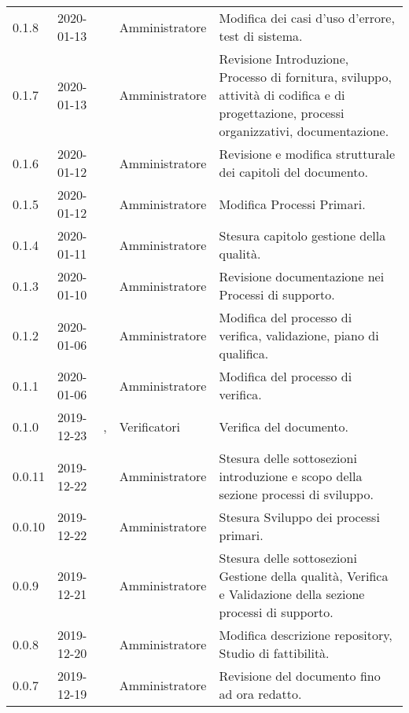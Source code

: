 {\begin{longtable}{C{2cm} C{2cm}  C{3cm}  C{3cm} C{4.5cm}}
0.1.8 & 2020-01-13 & \BR{} & Amministratore & Modifica dei casi d'uso d'errore, test di sistema. \\

0.1.7 & 2020-01-13 & \AT{} & Amministratore & Revisione Introduzione, Processo di fornitura, sviluppo, attività di codifica e di progettazione, processi organizzativi, documentazione. \\

0.1.6 & 2020-01-12 & \MC{} & Amministratore & Revisione e modifica strutturale dei capitoli del documento. \\

0.1.5 & 2020-01-12 & \AT{} & Amministratore & Modifica Processi Primari. \\

0.1.4 & 2020-01-11 & \MC{} & Amministratore & Stesura capitolo gestione della qualità. \\

0.1.3 & 2020-01-10 & \MC{} & Amministratore & Revisione documentazione nei Processi di supporto. \\

0.1.2 & 2020-01-06 & \AT{} & Amministratore & Modifica del processo di verifica, validazione, piano di qualifica. \\

0.1.1 & 2020-01-06 & \AT{} & Amministratore & Modifica del processo di verifica. \\

0.1.0 & 2019-12-23 & \PF{}, \CE{} & Verificatori & Verifica del documento. \\

0.0.11 & 2019-12-22 & \PF{} & Amministratore & Stesura delle sottosezioni introduzione e scopo della sezione processi di sviluppo. \\

0.0.10 & 2019-12-22 & \PF{}  & Amministratore & Stesura Sviluppo dei processi primari. \\

0.0.9 & 2019-12-21 & \PF{} & Amministratore & Stesura delle sottosezioni Gestione della qualità, Verifica e Validazione della sezione processi di supporto. \\

0.0.8 & 2019-12-20 & \MC{} & Amministratore & Modifica descrizione repository, Studio di fattibilità. \\

0.0.7 & 2019-12-19 & \SE{} & Amministratore & Revisione del documento fino ad ora redatto. \\


\end{longtable}}
